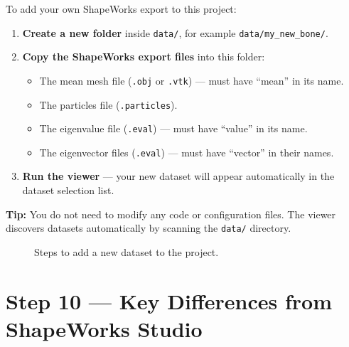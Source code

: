 \documentclass[12pt,a4paper]{article}
\begin{document}
To add your own ShapeWorks export to this project:

\begin{enumerate}[itemsep=0.5em]
    \item \textbf{Create a new folder} inside \texttt{data/}, for example \texttt{data/my\_new\_bone/}.

    \item \textbf{Copy the ShapeWorks export files} into this folder:
    \begin{itemize}
        \item The mean mesh file (\texttt{.obj} or \texttt{.vtk}) --- must have ``mean'' in its name.
        \item The particles file (\texttt{.particles}).
        \item The eigenvalue file (\texttt{.eval}) --- must have ``value'' in its name.
        \item The eigenvector files (\texttt{.eval}) --- must have ``vector'' in their names.
    \end{itemize}

    \item \textbf{Run the viewer} --- your new dataset will appear automatically in the dataset selection list.
\end{enumerate}

\begin{mdframed}[backgroundcolor=codegray, linecolor=notegreen, linewidth=1.5pt]
\textbf{Tip:} You do not need to modify any code or configuration files. The viewer discovers datasets automatically by scanning the \texttt{data/} directory.
\end{mdframed}

\begin{figure}[H]
    \centering
    \caption{Steps to add a new dataset to the project.}
    \label{fig:adding_dataset}
\end{figure}

\section{Step 10 --- Key Differences from ShapeWorks Studio}
\end{document}
